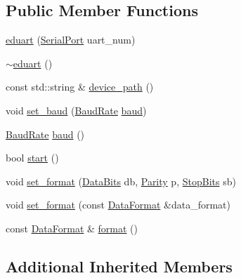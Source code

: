 \subsection*{Public Member Functions}
\begin{DoxyCompactItemize}
\item 
\hyperlink{classeduart_a95a97e53a2ba1ae4bb72b39b474e8de6}{eduart} (\hyperlink{classeduart_a3eb9c53aa8b561a7c0de832314e4910c}{Serial\-Port} uart\-\_\-num)
\item 
\hyperlink{classeduart_adc0cc6a48ebaaaa297aff0c073aa8474}{$\sim$eduart} ()
\item 
const std\-::string \& \hyperlink{classeduart_ae409534073cbe8469ce8e6aed502730a}{device\-\_\-path} ()
\item 
void \hyperlink{classeduart_aef4703307a8f07bf31ec06050e5e4596}{set\-\_\-baud} (\hyperlink{classeduart_af5d40999cc13e078f9d349a08ffe250e}{Baud\-Rate} \hyperlink{classeduart_a5243e3f72554fe7463989e245e91e172}{baud})
\item 
\hyperlink{classeduart_af5d40999cc13e078f9d349a08ffe250e}{Baud\-Rate} \hyperlink{classeduart_a5243e3f72554fe7463989e245e91e172}{baud} ()
\item 
bool \hyperlink{classeduart_ae50ab2faddd54ed231380583b717ad5a}{start} ()
\item 
void \hyperlink{classeduart_ab57fd0de8fa9f541f6b925cbe53e13ba}{set\-\_\-format} (\hyperlink{classeduart_a5211d2ecc2f21296eafe114ca999abb2}{Data\-Bits} db, \hyperlink{classeduart_ab706a92a2abdd39b748492f26d89fa75}{Parity} p, \hyperlink{classeduart_a81d64a65349ee87e6bff9e99c1a2a4fa}{Stop\-Bits} sb)
\item 
void \hyperlink{classeduart_a9b5869ad89fc0c6fc14ab24485f441ed}{set\-\_\-format} (const \hyperlink{structeduart_1_1DataFormat}{Data\-Format} \&data\-\_\-format)
\item 
const \hyperlink{structeduart_1_1DataFormat}{Data\-Format} \& \hyperlink{classeduart_a5b40ea037124171636fc44f327b7bd66}{format} ()
\end{DoxyCompactItemize}
\subsection*{Additional Inherited Members}


